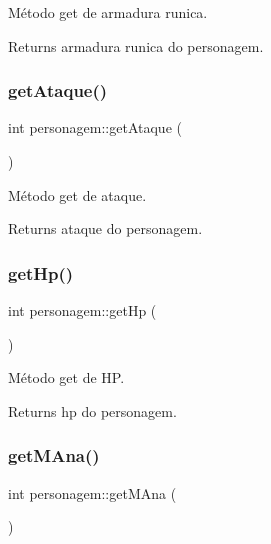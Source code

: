 Método get de armadura runica. 

\begin{DoxyReturn}{Returns}
armadura runica do personagem. 
\end{DoxyReturn}
\mbox{\label{classpersonagem_a70a912dec9dcdedffa208fb3a709fa57}} 
\subsubsection{\texorpdfstring{get\+Ataque()}{getAtaque()}}
{\footnotesize\ttfamily int personagem\+::get\+Ataque (\begin{DoxyParamCaption}{ }\end{DoxyParamCaption})}



Método get de ataque. 

\begin{DoxyReturn}{Returns}
ataque do personagem. 
\end{DoxyReturn}
\mbox{\label{classpersonagem_aae06914f2a7ab169b55863d5915341b3}} 
\subsubsection{\texorpdfstring{get\+Hp()}{getHp()}}
{\footnotesize\ttfamily int personagem\+::get\+Hp (\begin{DoxyParamCaption}{ }\end{DoxyParamCaption})}



Método get de HP. 

\begin{DoxyReturn}{Returns}
hp do personagem. 
\end{DoxyReturn}
\mbox{\label{classpersonagem_acb34b3c679e4488e624ea53faf6aef62}} 
\subsubsection{\texorpdfstring{get\+M\+Ana()}{getMAna()}}
{\footnotesize\ttfamily int personagem\+::get\+M\+Ana (\begin{DoxyParamCaption}{ }\end{DoxyParamCaption})}



